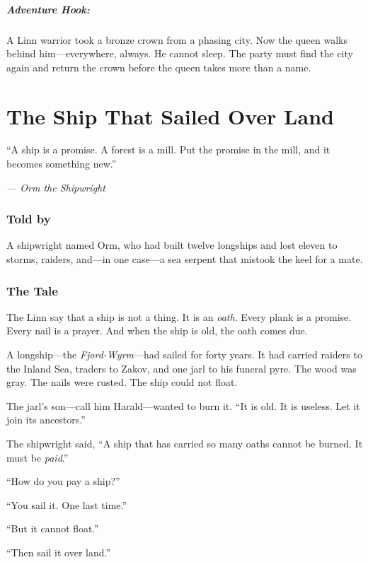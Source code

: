 \documentclass[9pt,a5paper]{extbook}
\begin{document}
\paragraph{Adventure Hook:}
A Linn warrior took a bronze crown from a phasing city. Now the queen walks behind him---everywhere, always. He cannot sleep. The party must find the city again and return the crown before the queen takes more than a name.

\clearpage

\chapter{The Ship That Sailed Over Land}

\epigraph{``A ship is a promise. A forest is a mill. Put the promise in the mill, and it becomes something new.''}{\textit{--- Orm the Shipwright}}

\subsection*{Told by}

A shipwright named Orm, who had built twelve longships and lost eleven to storms, raiders, and---in one case---a sea serpent that mistook the keel for a mate.

\subsection*{The Tale}

The Linn say that a ship is not a thing. It is an \textit{oath}. Every plank is a promise. Every nail is a prayer. And when the ship is old, the oath comes due.

A longship---the \textit{Fjord-Wyrm}---had sailed for forty years. It had carried raiders to the Inland Sea, traders to Zakov, and one jarl to his funeral pyre. The wood was gray. The nails were rusted. The ship could not float.

The jarl's son---call him Harald---wanted to burn it. ``It is old. It is useless. Let it join its ancestors.''

The shipwright said, ``A ship that has carried so many oaths cannot be burned. It must be \textit{paid}.''

``How do you pay a ship?''

``You sail it. One last time.''

``But it cannot float.''

``Then sail it over land.''
\end{document}

